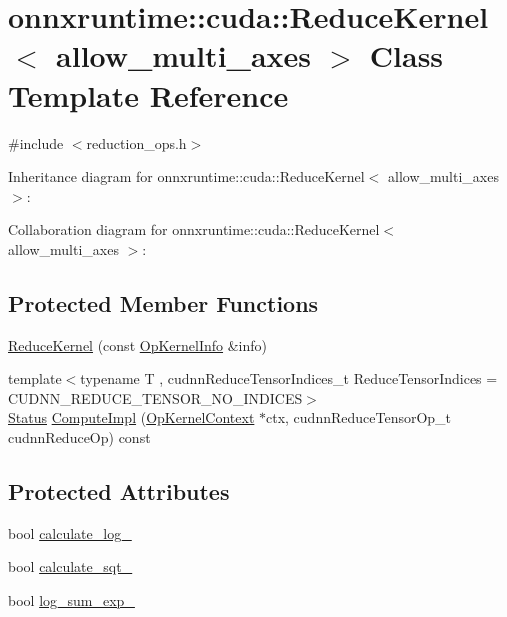\hypertarget{classonnxruntime_1_1cuda_1_1ReduceKernel}{}\section{onnxruntime\+:\+:cuda\+:\+:Reduce\+Kernel$<$ allow\+\_\+multi\+\_\+axes $>$ Class Template Reference}
\label{classonnxruntime_1_1cuda_1_1ReduceKernel}


{\ttfamily \#include $<$reduction\+\_\+ops.\+h$>$}



Inheritance diagram for onnxruntime\+:\+:cuda\+:\+:Reduce\+Kernel$<$ allow\+\_\+multi\+\_\+axes $>$\+:


Collaboration diagram for onnxruntime\+:\+:cuda\+:\+:Reduce\+Kernel$<$ allow\+\_\+multi\+\_\+axes $>$\+:
\subsection*{Protected Member Functions}
\begin{DoxyCompactItemize}
\item 
\mbox{\hyperlink{classonnxruntime_1_1cuda_1_1ReduceKernel_a0457438075f6fc836915d9642ddf69e3}{Reduce\+Kernel}} (const \mbox{\hyperlink{classonnxruntime_1_1OpKernelInfo}{Op\+Kernel\+Info}} \&info)
\item 
{\footnotesize template$<$typename T , cudnn\+Reduce\+Tensor\+Indices\+\_\+t Reduce\+Tensor\+Indices = C\+U\+D\+N\+N\+\_\+\+R\+E\+D\+U\+C\+E\+\_\+\+T\+E\+N\+S\+O\+R\+\_\+\+N\+O\+\_\+\+I\+N\+D\+I\+C\+ES$>$ }\\\mbox{\hyperlink{classonnxruntime_1_1common_1_1Status}{Status}} \mbox{\hyperlink{classonnxruntime_1_1cuda_1_1ReduceKernel_aa4b114d4b21ef1c197d294c33f7c6121}{Compute\+Impl}} (\mbox{\hyperlink{classonnxruntime_1_1OpKernelContext}{Op\+Kernel\+Context}} $\ast$ctx, cudnn\+Reduce\+Tensor\+Op\+\_\+t cudnn\+Reduce\+Op) const
\end{DoxyCompactItemize}
\subsection*{Protected Attributes}
\begin{DoxyCompactItemize}
\item 
bool \mbox{\hyperlink{classonnxruntime_1_1cuda_1_1ReduceKernel_a548d3c1acc9c6cb71db58cb83bdd7074}{calculate\+\_\+log\+\_\+}}
\item 
bool \mbox{\hyperlink{classonnxruntime_1_1cuda_1_1ReduceKernel_a69abc49b967b0436057b8ec592df23de}{calculate\+\_\+sqt\+\_\+}}
\item 
bool \mbox{\hyperlink{classonnxruntime_1_1cuda_1_1ReduceKernel_ae5c339a6fe3a74114dc1ca9b1baae9da}{log\+\_\+sum\+\_\+exp\+\_\+}}
\end{DoxyCompactItemize}
